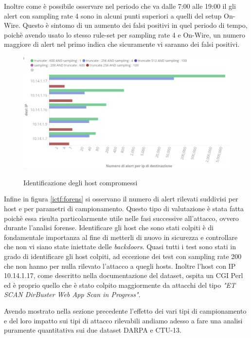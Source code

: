 \documentclass[12pt,a4paper,openright,twoside]{report}
\begin{document}
Inoltre come \`e possibile osservare nel periodo che va dalle 7:00 alle 19:00 il gli alert
con sampling rate 4 sono in alcuni punti superiori a quelli del setup On-Wire. Questo
\`e sintomo di un aumento dei falsi positivi in quel periodo di tempo, poich\`e avendo usato
lo stesso rule-set per sampling rate 4 e On-Wire, un numero maggiore di alert nel primo
indica che sicuramente vi saranno dei falsi positivi.


\begin{figure}[h!]
\begin{center}                          %
  \includegraphics[width=\textwidth]{images/ICTF-forens-dest.png}
  \caption{Identificazione degli host compromessi}\label{ictf:forens}
  \label{}
\end{center}
\end{figure}

Infine in figura \ref{ictf:forens} si osservano il numero di alert rilevati suddivisi per host
e per parametri di campionamento. Questo tipo di valutazione \`e stata fatta poich\`e essa risulta particolarmente
utile nelle fasi successive all'attacco, ovvero durante l'analisi forense. Identificare gli
host che sono stati colpiti \`e di fondamentale importanza al fine di metterli di nuovo
in sicurezza e controllare che non vi siano state iniettate delle {\it backdoors}.
Quasi tutti i test sono stati in grado di identificare gli host colpiti, ad eccezione
dei test con sampling rate 200 che non hanno per nulla rilevato l'attacco a quegli hosts.
Inoltre l'host con IP 10.14.1.17, come descritto nella documentazione del dataset,
ospita un CGI Perl ed \`e proprio quello che \`e stato
colpito maggiormente da attacchi del tipo  {\it "ET SCAN DirBuster Web App Scan in Progress"}.

\clearpage

Avendo mostrato nella sezione precedente l'effetto dei vari tipi di campionamento
e del loro impatto sui tipi di attacco rilevabili andiamo adesso a fare una analisi
puramente quantitativa sui due dataset DARPA e CTU-13.
\end{document}
